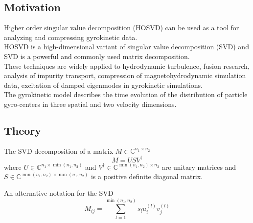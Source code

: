 \documentclass[../../main.tex]{subfiles}
\begin{document}
\subsection{Motivation}
Higher order singular value decomposition (HOSVD) can be used as a tool for analyzing and compressing gyrokinetic data.\\ 
HOSVD is a high-dimensional variant of singular value decomposition (SVD) and SVD is a powerful and commonly used matrix decomposition.\\
These techniques are widely applied to hydrodynamic turbulence, fusion research, analysis of impurity transport, compression of magnetohydrodynamic simulation data, excitation of damped eigenmodes in gyrokinetic simulations.\\
The gyrokinetic model describes the time evolution of the distribution of particle gyro-centers in three spatial and
two velocity dimensions.







\subsection{Theory}

The SVD decomposition of a matrix $M \in \mathbb{C}^{n_1\times n_2}$
    \[  M = USV^{\dag} \]
where $U \in \mathbb{C}^{n_1\times\min(n_1, n_2)}$ and $V^{\dag} \in \mathbb{C}^{\min(n_1, n_2)\times n_2}$ are unitary matrices and $S \in \mathbb{C}^{\min(n_1, n_2)\times \min(n_1, n_2)}$ is a positive definite diagonal matrix.


An alternative notation for the SVD 
    \[ M_{ij} = \sum_{l = 1}^{\min(n_1, n_2)} s_lu_i^{(l)}v_j^{(l)} \]
    
\end{document}
